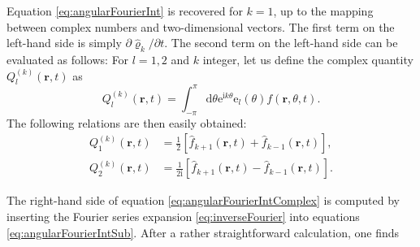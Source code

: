 \documentclass{article}
\begin{document}
Equation \eqref{eq:angularFourierInt} is recovered for $k = 1$, up to the mapping between complex numbers and two-dimensional vectors. The first term on the left-hand side is simply $\partial \hat{\varrho}_k/\partial t$. The second term on the left-hand side can be evaluated as follows: For $l=1,2$ and $k$ integer, let us define the complex quantity $Q_{l}^{\left( k \right)}\left( \mathbf{r},t \right)$ as 
\begin{equation}
    Q_l^{(k)}(\mathbf{r},t)=\int_{-\pi}^\pi\mathrm{d}\theta \mathrm{e}^{\mathrm{i}k\theta}\mathrm{e}_l(\theta)f(\mathbf{r},\theta,t).
\end{equation}
The following relations are then easily obtained:
\begin{equation}
    \begin{aligned}
        Q_{1}^{(k)}(\mathbf{r},t)&=\frac{1}{2}[\hat{f}_{k+1}(\mathbf{r},t)+\hat{f}_{k-1}(\mathbf{r},t)],\\
        Q_{2}^{(k)}(\mathbf{r},t)&=\frac{1}{2\mathrm{i}}[\hat{f}_{k+1}(\mathbf{r},t)-\hat{f}_{k-1}(\mathbf{r},t)].
    \end{aligned}
\end{equation}


The right-hand side of equation \eqref{eq:angularFourierIntComplex} is computed by inserting the Fourier series expansion \eqref{eq:inverseFourier} into equations \eqref{eq:angularFourierIntSub}. 
After a rather straightforward calculation, one finds




\end{document}
